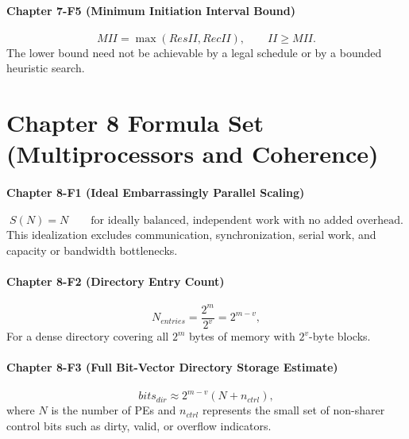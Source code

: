 \paragraph{Chapter 7-F5 (Minimum Initiation Interval Bound)}\label{par:ch7-formula-5}
\begin{equation}\label{eq:app-ch7-formula-min-ii}
    MII=\max(ResII,RecII),\qquad II\ge MII.
\end{equation}
The lower bound need not be achievable by a legal schedule or by a bounded heuristic search.


\section*{Chapter 8 Formula Set (Multiprocessors and Coherence)}\label{sec:ch8-formulas}

\paragraph{Chapter 8-F1 (Ideal Embarrassingly Parallel Scaling)}\label{par:ch8-formula-1}
\begin{equation}\label{eq:ch8-formula-ideal-scaling}
    S(N)=N \qquad \text{for ideally balanced, independent work with no added overhead.}
\end{equation}
This idealization excludes communication, synchronization, serial work, and capacity or bandwidth bottlenecks.

\paragraph{Chapter 8-F2 (Directory Entry Count)}\label{par:ch8-formula-2}
\begin{equation}\label{eq:ch8-formula-dir-entries}
    N_{entries}=\frac{2^m}{2^v}=2^{m-v},
\end{equation}
For a dense directory covering all $2^m$ bytes of memory with $2^v$-byte blocks.

\paragraph{Chapter 8-F3 (Full Bit-Vector Directory Storage Estimate)}\label{par:ch8-formula-3}
\begin{equation}\label{eq:ch8-formula-full-dir}
    bits_{dir}\approx 2^{m-v}\left(N+n_{ctrl}\right),
\end{equation}
where $N$ is the number of PEs and $n_{ctrl}$ represents the small set of non-sharer control bits such as dirty, valid, or overflow indicators.

